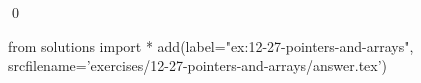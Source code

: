 
\begin{ex}
  \label{ex:12-27-pointers-and-arrays}
  
  \qed
\end{ex}
\begin{python0}
from solutions import *
add(label="ex:12-27-pointers-and-arrays",
    srcfilename='exercises/12-27-pointers-and-arrays/answer.tex')
\end{python0}
